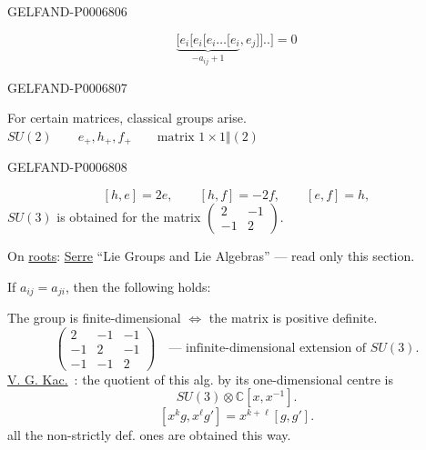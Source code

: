 \begin{GelfandAdjacentEvidence}{GELFAND-P000680}{6}

\[
\underbrace{[e_i[e_i[e_i\ldots[e_i}_{-a_{ij}+1},e_j]]\mathord{..}]=0
\]
\end{GelfandAdjacentEvidence}
\begin{GelfandAdjacentEvidence}{GELFAND-P000680}{7}


For certain matrices, classical groups arise.
\(SU(2)\qquad e_+,h_+,f_+\qquad\text{matrix }1\times1\Vert(2)\)
\end{GelfandAdjacentEvidence}
\begin{GelfandAdjacentEvidence}{GELFAND-P000680}{8}

\[
[h,e]=2e,\qquad[h,f]=-2f,\qquad[e,f]=h,
\]
\(SU(3)\) is obtained for the matrix \(\begin{pmatrix}2&-1\\-1&2\end{pmatrix}\).

On \underline{roots}: \underline{Serre} “Lie Groups and Lie Algebras” ---
read only this section.

If \(a_{ij}=a_{ji}\), then the following holds:

The group is finite-dimensional \(\Leftrightarrow\) the matrix is positive definite.
\[
\begin{pmatrix}
2&-1&-1\\
-1&2&-1\\
-1&-1&2
\end{pmatrix}
\quad\text{--- infinite-dimensional extension of }SU(3).
\]
\underline{V. G. Kac.}\ : the quotient of this alg. by its one-dimensional centre is
\[
SU(3)\otimes\mathbb C[x,x^{-1}].
\]
\[
[x^kg,x^\ell g']=x^{k+\ell}[g,g'].
\]
all the non-strictly def. ones are obtained this way.
\end{GelfandAdjacentEvidence}




